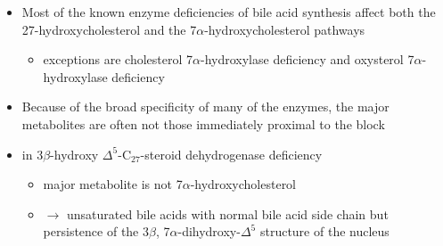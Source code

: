 \documentclass{scrartcl}
\begin{document}
\begin{itemize}
\item Most of the known enzyme deficiencies of bile acid synthesis affect
both the 27-hydroxycholesterol and the 7\(\alpha\)-hydroxycholesterol pathways
\begin{itemize}
\item exceptions are cholesterol 7\(\alpha\)-hydroxylase deficiency and
oxysterol 7\(\alpha\)-hydroxylase deficiency
\end{itemize}
\item Because of the broad specificity of many of the enzymes, the major
metabolites are often not those immediately proximal to the block
\item in 3\(\beta\)-hydroxy \(\Delta^{\text{5}}\)-C\(_{\text{27}}\)-steroid dehydrogenase deficiency
\begin{itemize}
\item major metabolite is not 7\(\alpha\)-hydroxycholesterol
\item \(\to\) unsaturated bile acids with normal bile acid side chain but
persistence of the 3\(\beta\), 7\(\alpha\)-dihydroxy-\(\Delta^{\text{5}}\) structure of
the nucleus
\end{itemize}
\end{itemize}
\end{document}
